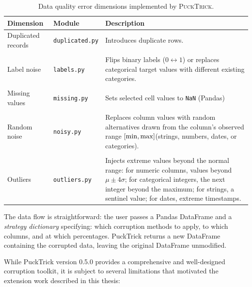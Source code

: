 \documentclass[../main.tex]{subfiles}
\begin{document}
\begin{enumerate}
    \begin{table}[H]
    \centering
    \caption{Data quality error dimensions implemented by
      \textsc{PuckTrick}.}
    \label{tab:dimensions}
    \small
    \begin{tabularx}{\textwidth}{llX}
      \toprule
      \textbf{Dimension} & \textbf{Module} & \textbf{Description} \\
      \midrule
      Duplicated records & \texttt{duplicated.py} &
        Introduces duplicate rows. \\ \\
      Label noise & \texttt{labels.py} &
        Flips binary labels ($0 \leftrightarrow 1$) or replaces
        categorical target values with different existing categories. \\ \\
      Missing values & \texttt{missing.py} &
        Sets selected cell values to \texttt{NaN} (Pandas)\\ \\
      Random noise & \texttt{noisy.py} &
        Replaces column values with random alternatives drawn from the column's observed range $[\min, \max]
        \newline
        $(strings, numbers, dates, or categories). \\ \\
      Outliers & \texttt{outliers.py} &
        Injects extreme values beyond the normal range: for numeric
        columns, values beyond $\mu \pm 4\sigma$; for categorical
        integers, the next integer beyond the maximum; for strings,
        a sentinel value; for dates, extreme timestamps. \\
      \bottomrule
    \end{tabularx}
    \end{table}

\end{enumerate}

The data flow is straightforward: the user passes a Pandas DataFrame and a
\emph{strategy dictionary} specifying: which corruption methods to apply, to
which columns, and at which percentages.  PuckTrick returns a new DataFrame
containing the corrupted data, leaving the original DataFrame unmodified.


While PuckTrick version 0.5.0 provides a comprehensive and well-designed
corruption toolkit, it is subject to several limitations that motivated the
extension work described in this thesis:
\end{document}
